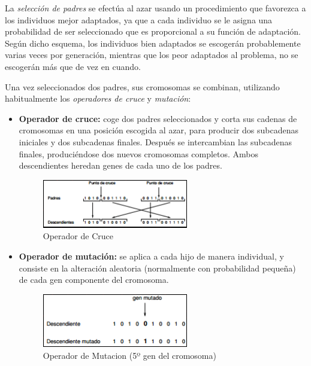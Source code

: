 \documentclass[a4paper, 11pt]{article} %
\begin{document}
La \textit{selección de padres} se efectúa al azar usando un procedimiento que favorezca a los individuos mejor
adaptados, ya que a cada individuo se le asigna una probabilidad de ser seleccionado que es proporcional a su función de adaptación. Según dicho esquema, los individuos bien adaptados se escogerán probablemente varias veces por generación, mientras que los peor adaptados al problema, no se escogerán más que de vez en
cuando.

Una vez seleccionados dos padres, sus cromosomas se combinan, utilizando habitualmente los \textit{operadores
de cruce} y \textit{mutación}:

\begin{itemize}
    \item \textbf{Operador de cruce:} coge dos padres seleccionados y corta sus cadenas de cromosomas en una posición escogida al azar, para producir dos subcadenas iniciales y dos subcadenas finales. Después se intercambian las subcadenas finales, produciéndose dos nuevos cromosomas completos. Ambos descendientes heredan genes de cada uno de los padres.

\begin{figure}[H]
\centering
\includegraphics[width=0.6\textwidth]{OperadorCruce.PNG}
\caption{Operador de Cruce}
\label{Operador de Cruce}
\end{figure}

    \item \textbf{Operador de mutación:} se aplica a cada hijo de manera individual, y consiste en la alteración aleatoria (normalmente con probabilidad pequeña) de cada gen componente del cromosoma.

\begin{figure}[H]
\centering
\includegraphics[width=0.6\textwidth]{OperadorMutacion.PNG}
\caption{Operador de Mutacion (5º gen del cromosoma)}
\label{Operador de Mutacion}
\end{figure}
\end{itemize}
\end{document}
